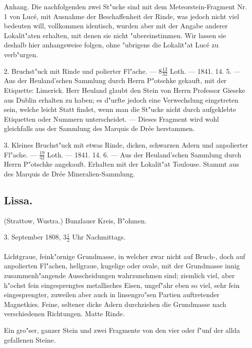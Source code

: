 \documentclass[a4paper, 11pt, oneside, polutonikogreek, german]{article}
\begin{document}
\setlength{\leftskip}{0pt}
\setlength{\parindent}{20pt}

Anhang. Die nachfolgenden zwei St"ucke sind mit dem Meteorstein-Fragment Nr. 1 von Lucé, mit Ausnahme der Beschaffenheit der Rinde, was jedoch nicht viel bedeuten will, vollkommen identisch, wurden aber mit der Angabe anderer Lokalit"aten erhalten, mit denen sie nicht "ubereinstimmen. Wir lassen sie deshalb hier anhangsweise folgen, ohne "ubrigens die Lokalit"at Lucé zu verb"urgen.

2. Bruchst"uck mit Rinde und polierter Fl"ache. --- $8\frac{13}{32}$ Loth. --- 1841. 14. 5. --- Aus der Heuland'schen Sammlung durch Herrn P"otschke gekauft, mit der Etiquette: Limerick. Herr Heuland glaubt den Stein von Herrn Professor Gieseke aus Dublin erhalten zu haben; es d"urfte jedoch eine Verwechslung eingetreten sein, welche leicht Statt findet, wenn man die St"ucke nicht durch aufgeklebte Etiquetten oder Nummern unterscheidet. --- Dieses Fragment wird wohl gleichfalls aus der Sammlung des Marquis de Drée herstammen.

3. Kleines Bruchst"uck mit etwas Rinde, dicken, schwarzen Adern und anpolierter Fl"ache. --- $\frac{19}{32}$ Loth. --- 1841. 14. 6. --- Aus der Heuland'schen Sammlung durch Herrn P"otschke angekauft. Erhalten mit der Lokalit"at Toulouse. Stammt aus des Marquis de Drée Mineralien-Sammlung.
\subsection{Lissa.}
\begin{center}
\small
(Strattow, Wustra.) Bunzlauer Kreis, B"ohmen.

3. September 1808, $3\frac{1}{2}$ Uhr Nachmittags.
\end{center}
\paragraph{}
Lichtgraue, feink"ornige Grundmasse, in welcher zwar nicht auf Bruch-, doch auf anpolierten Fl"achen, hellgraue, kugelige oder ovale, mit der Grundmasse innig zusammenh"angende Ausscheidungen wahrzunehmen sind; ziemlich viel, aber h"ochst fein eingesprengtes metallisches Eisen, ungef"ahr eben so viel, sehr fein eingesprengter, zuweilen aber auch in linsengro"sen Partien auftretender Magnetkies. Feine, seltener dicke Adern durchziehen die Grundmasse nach verschiedenen Richtungen. Matte Rinde.

Ein gro"ser, ganzer Stein und zwei Fragmente von den vier oder f"unf der allda gefallenen Steine.
\end{document}
